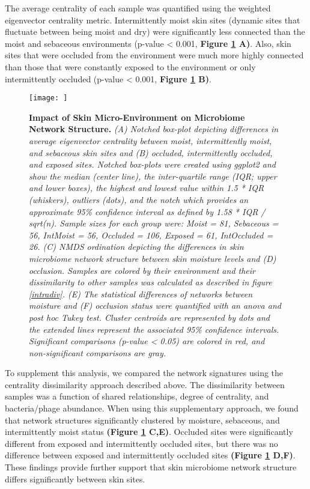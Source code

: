 \documentclass[12pt,]{article}
\begin{document}
The average centrality of each sample was quantified using the weighted
eigenvector centrality metric. Intermittently moist skin sites (dynamic
sites that fluctuate between being moist and dry) were significantly
less connected than the moist and sebaceous environments (p-value
\textless{} 0.001, \textbf{Figure \ref{skinnetwork} A)}. Also, skin
sites that were occluded from the environment were much more highly
connected than those that were constantly exposed to the environment or
only intermittently occluded (p-value \textless{} 0.001, \textbf{Figure
\ref{skinnetwork} B)}.

\begin{figure}[htbp]
\centering
\texttt{[image: ]}
\caption{\textbf{Impact of Skin Micro-Environment on Microbiome Network
Structure.} \emph{(A) Notched box-plot depicting differences in average
eigenvector centrality between moist, intermittently moist, and
sebaceous skin sites and (B) occluded, intermittently occluded, and
exposed sites. Notched box-plots were created using ggplot2 and show the
median (center line), the inter-quartile range (IQR; upper and lower
boxes), the highest and lowest value within 1.5 * IQR (whiskers),
outliers (dots), and the notch which provides an approximate 95\%
confidence interval as defined by 1.58 * IQR / sqrt(n). Sample sizes for
each group were: Moist = 81, Sebaceous = 56, IntMoist = 56, Occluded =
106, Exposed = 61, IntOccluded = 26. (C) NMDS ordination depicting the
differences in skin microbiome network structure between skin moisture
levels and (D) occlusion. Samples are colored by their environment and
their dissimilarity to other samples was calculated as described in
figure \ref{intradiv}. (E) The statistical differences of networks
between moisture and (F) occlusion status were quantified with an anova
and post hoc Tukey test. Cluster centroids are represented by dots and
the extended lines represent the associated 95\% confidence intervals.
Significant comparisons (p-value \textless{} 0.05) are colored in red,
and non-significant comparisons are gray.}\label{skinnetwork}}
\end{figure}

To supplement this analysis, we compared the network signatures using
the centrality dissimilarity approach described above. The dissimilarity
between samples was a function of shared relationships, degree of
centrality, and bacteria/phage abundance. When using this supplementary
approach, we found that network structures significantly clustered by
moisture, sebaceous, and intermittently moist status \textbf{(Figure
\ref{skinnetwork} C,E)}. Occluded sites were significantly different
from exposed and intermittently occluded sites, but there was no
difference between exposed and intermittently occluded sites
\textbf{(Figure \ref{skinnetwork} D,F)}. These findings provide further
support that skin microbiome network structure differs significantly
between skin sites.
\end{document}
